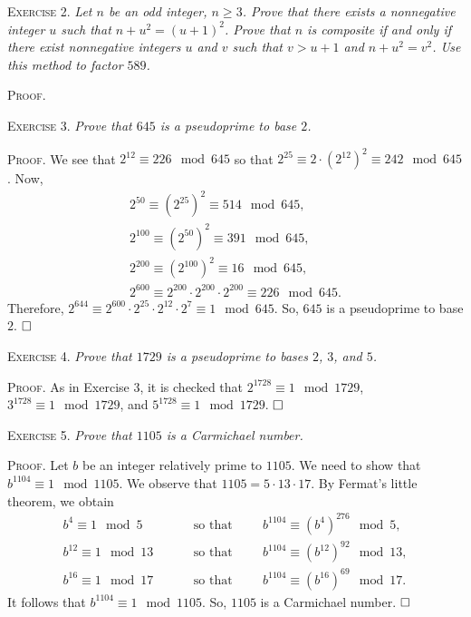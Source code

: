 \documentclass[11pt, leqno]{article}
\newcommand{\done}{\ensuremath{\hfill\square}}
\begin{document}
\textsc{Exercise 2}. \emph{Let $n$ be an odd integer, $n\geq 3$. Prove that there exists a nonnegative integer $u$ such that $n+u^2 = (u+1)^2$. Prove that $n$ is composite if and only if there exist nonnegative integers $u$ and $v$ such that $v > u + 1$ and $n+u^2 = v^2$. Use this method to factor $589$.}

\textsc{Proof}.

\textsc{Exercise 3}. \emph{Prove that $645$ is a pseudoprime to base $2$.}

\textsc{Proof}. We see that $2^{12}\equiv 226 \mod 645$ so that $2^{25} \equiv 2\cdot (2^{12})^2 \equiv 242 \mod 645$. Now,
\begin{align*}
  2^{50} \equiv (2^{25})^2 \equiv 514 \mod 645, \\
  2^{100} \equiv (2^{50})^2 \equiv  391 \mod 645, \\
  2^{200} \equiv (2^{100})^2 \equiv 16 \mod 645, \\
  2^{600} \equiv 2^{200}\cdot 2^{200} \cdot 2^{200} \equiv 226 \mod 645.
\end{align*}
Therefore, $2^{644} \equiv 2^{600} \cdot 2^{25} \cdot 2^{12} \cdot 2^7 \equiv 1 \mod 645$. So, $645$ is a pseudoprime to base $2$. \done

\textsc{Exercise 4}. \emph{Prove that $1729$ is a pseudoprime to bases $2$, $3$, and $5$.}

\textsc{Proof}. As in Exercise $3$, it is checked that $2^{1728} \equiv 1 \mod 1729$, $3^{1728} \equiv 1 \mod 1729$, and $5^{1728} \equiv 1 \mod 1729$. \done

\textsc{Exercise 5}. \emph{Prove that $1105$ is a Carmichael number.}

\textsc{Proof}. Let $b$ be an integer relatively prime to $1105$. We need to show that $b^{1104} \equiv 1 \mod 1105$. We observe that $1105 = 5 \cdot 13 \cdot 17$. By Fermat's little theorem, we obtain 
\begin{align*}
  b^4 \equiv 1 \mod 5 \hspace{1cm} &\text{so that} \hspace{1cm} b^{1104} \equiv (b^4)^{276} \mod 5,\\
  b^{12} \equiv 1 \mod 13 \hspace{1cm} &\text{so that} \hspace{1cm} b^{1104} \equiv (b^{12})^{92} \mod 13,\\
  b^{16} \equiv 1 \mod 17 \hspace{1cm} &\text{so that} \hspace{1cm} b^{1104} \equiv (b^{16})^{69} \mod 17.
\end{align*}
It follows that $b^{1104} \equiv 1 \mod 1105$. So, $1105$ is a Carmichael number. \done
\end{document}
